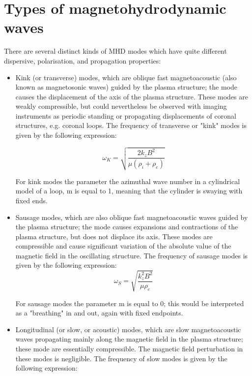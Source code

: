 \documentclass[../main.tex]{subfiles}
\begin{document}
\section{Types of magnetohydrodynamic waves}
\cite{coronalseism}


There are several distinct kinds of MHD modes which have quite different dispersive, polarisation, and propagation properties:

\begin{itemize}
\item Kink (or transverse) modes, which are oblique fast magnetoacoustic (also known as magnetosonic waves) guided by the plasma structure; the mode causes the displacement of the axis of the plasma structure. These modes are weakly compressible, but could nevertheless be observed with imaging instruments as periodic standing or propagating displacements of coronal structures, e.g. coronal loops. The frequency of transverse or "kink" modes is given by the following expression:

\begin{equation*}
\omega_{K}=\sqrt{\frac{2k_{z}B^{2}}{\mu (\rho_{i}+\rho_{e})}}
\end{equation*}

For kink modes the parameter the azimuthal wave number in a cylindrical model of a loop, m is equal to 1, meaning that the cylinder is swaying with fixed ends.

\item Sausage modes, which are also oblique fast magnetoacoustic waves guided by the plasma structure; the mode causes expansions and contractions of the plasma structure, but does not displace its axis. These modes are compressible and cause significant variation of the absolute value of the magnetic field in the oscillating structure. The frequency of sausage modes is given by the following expression:
\begin{equation*}
\omega_{S}=\sqrt{\frac{k_{z}^{2}B^{2}}{\mu \rho_{e}}}
\end{equation*}

For sausage modes the parameter m is equal to 0; this would be interpreted as a "breathing" in and out, again with fixed endpoints.

\item Longitudinal (or slow, or acoustic) modes, which are slow magnetoacoustic waves propagating mainly along the magnetic field in the plasma structure; these mode are essentially compressible. The magnetic field perturbation in these modes is negligible. The frequency of slow modes is given by the following expression:


\end{itemize}
\end{document}
